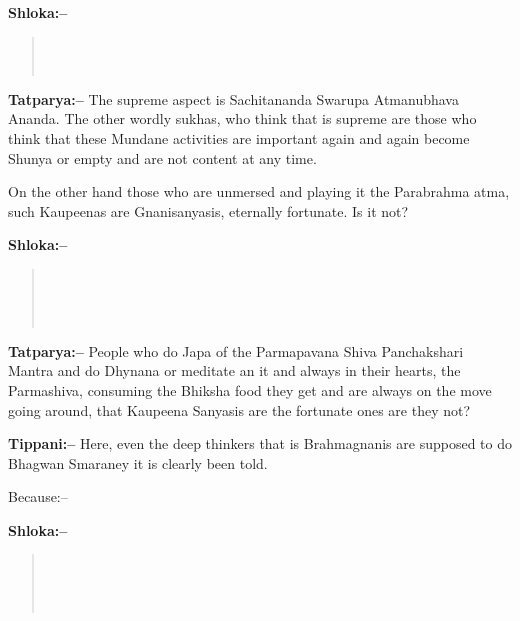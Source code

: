 \textbf{Shloka:–}

\begin{verse}
 \\\\ 
\end{verse}

\textbf{Tatparya:–} The supreme aspect is Sachitananda Swarupa Atmanubhava Ananda. The other wordly sukhas, who think that is supreme are those who think that these Mundane activities are important again and again become Shunya or empty and are not content at any time.

On the other hand those who are unmersed and playing it the Parabrahma atma, such Kaupeenas are Gnanisanyasis, eternally fortunate. Is it not?

\textbf{Shloka:–}

\begin{verse}
 \\\\\\ 
\end{verse}

\textbf{Tatparya:–} People who do Japa of the Parmapavana Shiva Panchakshari Mantra and do Dhynana or meditate an it and always in their hearts, the Parmashiva, consuming the Bhiksha food they get and are always on the move going around, that Kaupeena Sanyasis are the fortunate ones are they not?

\textbf{Tippani:–} Here, even the deep thinkers that is Brahmagnanis are supposed to do Bhagwan Smaraney it is clearly been told.

\vskip 8pt

Because:–

\vskip 6pt

\textbf{Shloka:–}

\begin{verse}
 \\\\\\
\end{verse}

